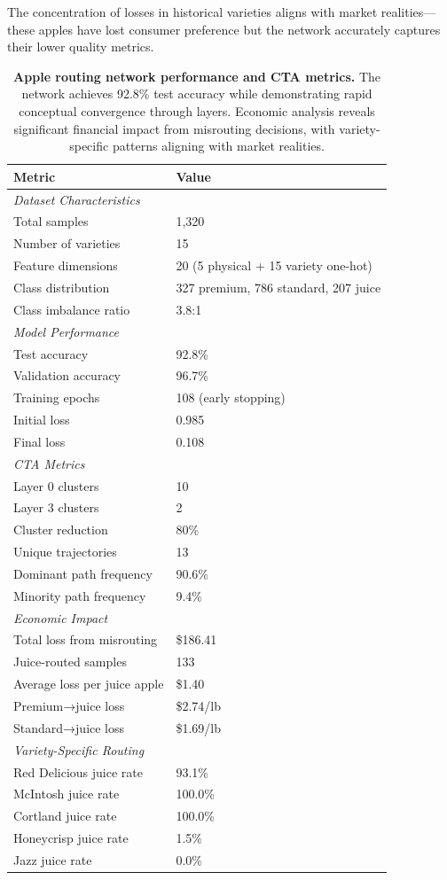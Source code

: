 \documentclass[11pt,a4paper]{article}
\begin{document}
The concentration of losses in historical varieties aligns with market realities—these apples have lost consumer preference but the network accurately captures their lower quality metrics.

\begin{table}[htbp]
\centering
\caption{\textbf{Apple routing network performance and CTA metrics.} The network achieves 92.8\% test accuracy while demonstrating rapid conceptual convergence through layers. Economic analysis reveals significant financial impact from misrouting decisions, with variety-specific patterns aligning with market realities.}
\label{tab:apple_results}
\begin{tabular}{ll}
\toprule
\textbf{Metric} & \textbf{Value} \\
\midrule
\multicolumn{2}{l}{\textit{Dataset Characteristics}} \\
Total samples & 1,320 \\
Number of varieties & 15 \\
Feature dimensions & 20 (5 physical + 15 variety one-hot) \\
Class distribution & 327 premium, 786 standard, 207 juice \\
Class imbalance ratio & 3.8:1 \\
\midrule
\multicolumn{2}{l}{\textit{Model Performance}} \\
Test accuracy & 92.8\% \\
Validation accuracy & 96.7\% \\
Training epochs & 108 (early stopping) \\
Initial loss & 0.985 \\
Final loss & 0.108 \\
\midrule
\multicolumn{2}{l}{\textit{CTA Metrics}} \\
Layer 0 clusters & 10 \\
Layer 3 clusters & 2 \\
Cluster reduction & 80\% \\
Unique trajectories & 13 \\
Dominant path frequency & 90.6\% \\
Minority path frequency & 9.4\% \\
\midrule
\multicolumn{2}{l}{\textit{Economic Impact}} \\
Total loss from misrouting & \$186.41 \\
Juice-routed samples & 133 \\
Average loss per juice apple & \$1.40 \\
Premium→juice loss & \$2.74/lb \\
Standard→juice loss & \$1.69/lb \\
\midrule
\multicolumn{2}{l}{\textit{Variety-Specific Routing}} \\
Red Delicious juice rate & 93.1\% \\
McIntosh juice rate & 100.0\% \\
Cortland juice rate & 100.0\% \\
Honeycrisp juice rate & 1.5\% \\
Jazz juice rate & 0.0\% \\
\bottomrule
\end{tabular}
\end{table}
\end{document}
